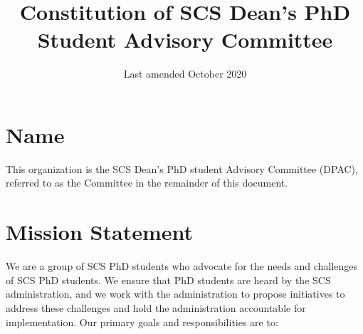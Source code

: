 \documentclass{article}
\title{Constitution of SCS Dean's PhD Student Advisory Committee}
\author{}
\date{Last amended October 2020}
\begin{document}
\setlength{\parskip}{1em}
\maketitle









\section{Name} \label{sec:name}
This organization is the SCS Dean's PhD student Advisory Committee (DPAC), referred to as the Committee in the remainder of this document. 

\section{Mission Statement} \label{sec:mission}

We are a group of SCS PhD students who advocate for the needs and challenges of SCS PhD students. We ensure that PhD students are heard by the SCS administration, and we work with the administration to propose initiatives to address these challenges and hold the administration accountable for implementation. Our primary goals and responsibilities are to:
\end{document}
